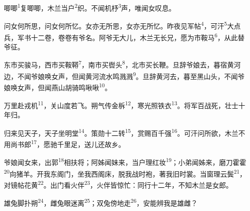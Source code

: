 
\begin{poem}
唧唧\textsuperscript{1}复唧唧，木兰当户\textsuperscript{2}织。不闻机杼\textsuperscript{3}声，唯闻女叹息。

问女何所思，问女何所忆。女亦无所思，女亦无所忆。昨夜见军帖\textsuperscript{4}，可汗\textsuperscript{5}大点兵，军书十二卷，卷卷有爷名。阿爷无大儿，木兰无长兄，愿为市鞍马\textsuperscript{6}，从此替爷征。

东市买骏马，西市买鞍鞯\textsuperscript{7}，南市买辔头\textsuperscript{8}，北市买长鞭。旦辞爷娘去，暮宿黄河边，不闻爷娘唤女声，但闻黄河流水鸣溅溅\textsuperscript{9}。旦辞黄河去，暮至黑山头，不闻爷娘唤女声，但闻燕山胡骑鸣啾啾\textsuperscript{10}。

万里赴戎机\textsuperscript{11}，关山度若飞。朔气传金柝\textsuperscript{12}，寒光照铁衣\textsuperscript{13}。将军百战死，壮士十年归。

归来见天子，天子坐明堂\textsuperscript{14}。策勋十二转\textsuperscript{15}，赏赐百千强\textsuperscript{16}。可汗问所欲，木兰不用尚书郎\textsuperscript{17}，愿驰千里足，送儿还故乡。

爷娘闻女来，出郭\textsuperscript{18}相扶将；阿姊闻妹来，当户理红妆\textsuperscript{19}；小弟闻姊来，磨刀霍霍\textsuperscript{20}向猪羊。开我东阁门，坐我西阁床，脱我战时袍，著我旧时裳。当窗理云鬓\textsuperscript{21}，对镜帖花黄\textsuperscript{22}。出门看火伴\textsuperscript{23}，火伴皆惊忙：同行十二年，不知木兰是女郎。

雄兔脚扑朔\textsuperscript{24}，雌兔眼迷离\textsuperscript{25}；双兔傍地走\textsuperscript{26}，安能辨我是雄雌？
\end{poem}

